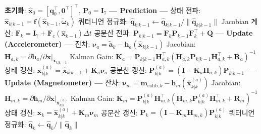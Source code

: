 \begin{algorithm}[H]
    \caption{Extended Kalman Filter for AHRS}
    \label{alg:ekf}
    \begin{algorithmic}[1]
        \State \textbf{초기화}: $\hat{\mathbf{x}}_0 = [\mathbf{q}_0^\top, \mathbf{0}^\top]^\top$, $\mathbf{P}_0 = \mathbf{I}_7$
            \State \textbf{--- Prediction ---}
            \State 상태 전파: $\hat{\mathbf{x}}_{k|k-1} = \mathbf{f}(\hat{\mathbf{x}}_{k-1}, \tilde{\boldsymbol{\omega}}_k)$
            \State 쿼터니언 정규화: $\hat{\mathbf{q}}_{k|k-1} \leftarrow \hat{\mathbf{q}}_{k|k-1} / \|\hat{\mathbf{q}}_{k|k-1}\|$
            \State Jacobian 계산: $\mathbf{F}_k = \mathbf{I}_7 + \mathbf{F}_c(\hat{\mathbf{x}}_{k-1})\Delta t$
            \State 공분산 전파: $\mathbf{P}_{k|k-1} = \mathbf{F}_k \mathbf{P}_{k-1} \mathbf{F}_k^\top + \mathbf{Q}$
            \State \textbf{--- Update (Accelerometer) ---}
            \State 잔차: $\boldsymbol{\nu}_a = \tilde{\mathbf{a}}_k - \mathbf{h}_a(\hat{\mathbf{x}}_{k|k-1})$
            \State Jacobian: $\mathbf{H}_{a,k} = \partial\mathbf{h}_a/\partial\mathbf{x}\big|_{\hat{\mathbf{x}}_{k|k-1}}$
            \State Kalman Gain: $\mathbf{K}_a = \mathbf{P}_{k|k-1}\mathbf{H}_{a,k}^\top(\mathbf{H}_{a,k}\mathbf{P}_{k|k-1}\mathbf{H}_{a,k}^\top + \mathbf{R}_a)^{-1}$
            \State 상태 갱신: $\hat{\mathbf{x}}_{k|k}^{(a)} = \hat{\mathbf{x}}_{k|k-1} + \mathbf{K}_a\boldsymbol{\nu}_a$
            \State 공분산 갱신: $\mathbf{P}_{k|k}^{(a)} = (\mathbf{I} - \mathbf{K}_a\mathbf{H}_{a,k})\mathbf{P}_{k|k-1}$
            \State \textbf{--- Update (Magnetometer) ---}
            \State 잔차: $\boldsymbol{\nu}_m = \mathbf{m}_{\text{calib},k} - \mathbf{h}_m(\hat{\mathbf{x}}_{k|k}^{(a)})$
            \State Jacobian: $\mathbf{H}_{m,k} = \partial\mathbf{h}_m/\partial\mathbf{x}\big|_{\hat{\mathbf{x}}_{k|k}^{(a)}}$
            \State Kalman Gain: $\mathbf{K}_m = \mathbf{P}_{k|k}^{(a)}\mathbf{H}_{m,k}^\top(\mathbf{H}_{m,k}\mathbf{P}_{k|k}^{(a)}\mathbf{H}_{m,k}^\top + \mathbf{R}_m)^{-1}$
            \State 상태 갱신: $\hat{\mathbf{x}}_k = \hat{\mathbf{x}}_{k|k}^{(a)} + \mathbf{K}_m\boldsymbol{\nu}_m$
            \State 공분산 갱신: $\mathbf{P}_k = (\mathbf{I} - \mathbf{K}_m\mathbf{H}_{m,k})\mathbf{P}_{k|k}^{(a)}$
            \State 쿼터니언 정규화: $\hat{\mathbf{q}}_k \leftarrow \hat{\mathbf{q}}_k / \|\hat{\mathbf{q}}_k\|$
        \EndFor
    \end{algorithmic}
\end{algorithm}


